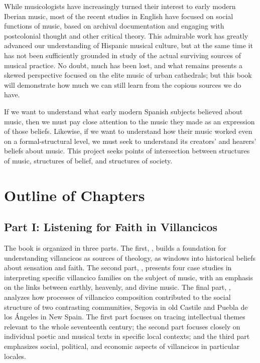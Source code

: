 \documentclass{vcbook-proposal}
\begin{document}
While musicologists have increasingly turned their interest to early modern Iberian music, most of the recent studies in English have focused on social functions of music, based on archival documentation and engaging with postcolonial thought and other critical theory.
This admirable work has greatly advanced our understanding of Hispanic musical culture, but at the same time it has not been sufficiently grounded in study of the actual surviving sources of musical practice.
No doubt, much has been lost, and what remains presents a skewed perspective focused on the elite music of urban cathedrals; but this book will demonstrate how much we can still learn from the copious sources we do have.

If we want to understand what early modern Spanish subjects believed about music, then we must pay close attention to the music they made as an expression of those beliefs.
Likewise, if we want to understand how their music worked even on a formal-structural level, we must seek to understand its creators' and hearers' beliefs about music.
This project seeks points of intersection between structures of music, structures of belief, and structures of society.


\section{Outline of Chapters}

\subsection{Part I: Listening for Faith in Villancicos}

The book is organized in three parts.
The first, , builds a foundation for understanding villancicos as sources of theology, as windows into historical beliefs about sensation and faith.
The second part, , presents four case studies in interpreting specific villancico families on the subject of music, with an emphasis on the links between earthly, heavenly, and divine music.
The final part, , analyzes how processes of villancico composition contributed to the social structure of two contrasting communities, Segovia in old Castile and Puebla de los Ángeles in New Spain.
The first part focuses on tracing intellectual themes relevant to the whole seventeenth century; the second part focuses closely on individual poetic and musical texts in specific local contexts; and the third part emphasizes social, political, and economic aspects of villancicos in particular locales.
\end{document}
